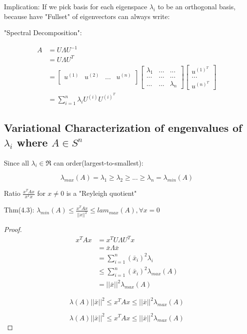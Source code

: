 Implication: If we pick basis for each eigenspace $\lambda_i$ to be an orthogonal basis, because have "Fullset" of eigenvectors can always write:

"Spectral Decomposition":

\begin{align*}
A &= U\Lambda U^{-1}\\
&= U\Lambda U^{T}\\
&= 
\begin{bmatrix}%
u^{(1)} & u^{(2)} & ... & u^{(n)}\\
\end{bmatrix}
\begin{bmatrix}%
\lambda_1 & ... & ...\\
... & ... & ...\\
... & ... & \lambda_n
\end{bmatrix}
\begin{bmatrix}%
u^{(1)^T}\\
...\\
u^{(n)^T}
\end{bmatrix}\\
&= \sum^n_{i=1}\lambda_iU^{(i)}U^{(i)^T}
\end{align*}

\subsection{Variational Characterization of engenvalues of $\lambda_i$ where $A\in S^n$} 

Since all $\lambda_i \in \Re$ can order(largest-to-smallest):

\begin{equation*}
\lambda_{max}(A) = \lambda_1 \geq \lambda_2 \geq ... \geq \lambda_n =\lambda_{min}(A)
\end{equation*}

Ratio $\frac{x^TAx}{x^Tx}$ for $x\neq 0$ is a "Reyleigh quotient"

Thm(4.3): $\lambda_{min}(A) \leq \frac{x^TAx}{||x||^2}\leq lam
_{max}(A), \forall x = 0$


\begin{proof}
	\begin{align*}
	x^TAx &= x^TU\Lambda U^Tx\\
	&= \bar{x}\Lambda\bar{x}\\
	&= \sum^n_{i=1}(\bar{x}_i)^2\lambda_i\\
	&\leq \sum^n_{i=1}(\bar{x}_i)^2\lambda_{max}(A)\\
	&= ||\bar{x}||^2\lambda_{max}(A)
	\end{align*}
	
	\begin{equation*}
	\lambda(A)||\bar{x}||^2 \leq x^TAx \leq ||\bar{x}||^2\lambda_{max}(A)
	\end{equation*}
	
	\begin{equation*}
	\lambda(A)||\bar{x}||^2 \leq x^TAx \leq ||\bar{x}||^2\lambda_{max}(A)
	\end{equation*}
\end{proof}


